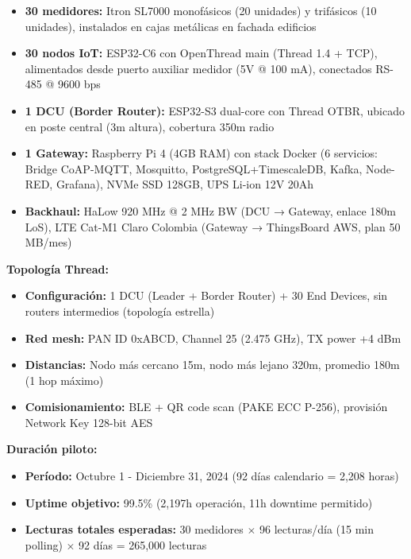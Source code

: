 \begin{itemize}
    \item \textbf{30 medidores:} Itron SL7000 monofásicos (20 unidades) y trifásicos (10 unidades), instalados en cajas metálicas en fachada edificios
    \item \textbf{30 nodos IoT:} ESP32-C6 con OpenThread main (Thread 1.4 + TCP), alimentados desde puerto auxiliar medidor (5V @ 100 mA), conectados RS-485 @ 9600 bps
    \item \textbf{1 DCU (Border Router):} ESP32-S3 dual-core con Thread OTBR, ubicado en poste central (3m altura), cobertura 350m radio
    \item \textbf{1 Gateway:} Raspberry Pi 4 (4GB RAM) con stack Docker (6 servicios: Bridge CoAP-MQTT, Mosquitto, PostgreSQL+TimescaleDB, Kafka, Node-RED, Grafana), NVMe SSD 128GB, UPS Li-ion 12V 20Ah
    \item \textbf{Backhaul:} HaLow 920 MHz @ 2 MHz BW (DCU → Gateway, enlace 180m LoS), LTE Cat-M1 Claro Colombia (Gateway → ThingsBoard AWS, plan 50 MB/mes)
\end{itemize}

\textbf{Topología Thread:}

\begin{itemize}
    \item \textbf{Configuración:} 1 DCU (Leader + Border Router) + 30 End Devices, sin routers intermedios (topología estrella)
    \item \textbf{Red mesh:} PAN ID 0xABCD, Channel 25 (2.475 GHz), TX power +4 dBm
    \item \textbf{Distancias:} Nodo más cercano 15m, nodo más lejano 320m, promedio 180m (1 hop máximo)
    \item \textbf{Comisionamiento:} BLE + QR code scan (PAKE ECC P-256), provisión Network Key 128-bit AES
\end{itemize}

\textbf{Duración piloto:}

\begin{itemize}
    \item \textbf{Período:} Octubre 1 - Diciembre 31, 2024 (92 días calendario = 2,208 horas)
    \item \textbf{Uptime objetivo:} 99.5\% (2,197h operación, 11h downtime permitido)
    \item \textbf{Lecturas totales esperadas:} 30 medidores $\times$ 96 lecturas/día (15 min polling) $\times$ 92 días = 265,000 lecturas
\end{itemize}

